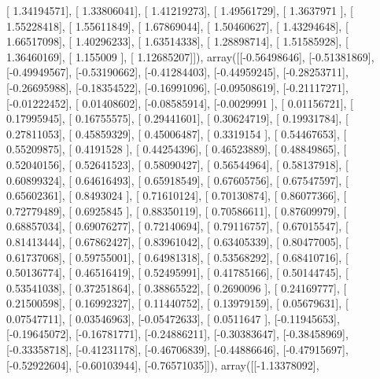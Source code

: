 \documentclass{article}
\begin{document}
       [ 1.34194571],
       [ 1.33806041],
       [ 1.41219273],
       [ 1.49561729],
       [ 1.3637971 ],
       [ 1.55228418],
       [ 1.55611849],
       [ 1.67869044],
       [ 1.50460627],
       [ 1.43294648],
       [ 1.66517098],
       [ 1.40296233],
       [ 1.63514338],
       [ 1.28898714],
       [ 1.51585928],
       [ 1.36460169],
       [ 1.155009  ],
       [ 1.12685207]]), array([[-0.56498646],
       [-0.51381869],
       [-0.49949567],
       [-0.53190662],
       [-0.41284403],
       [-0.44959245],
       [-0.28253711],
       [-0.26695988],
       [-0.18354522],
       [-0.16991096],
       [-0.09508619],
       [-0.21117271],
       [-0.01222452],
       [ 0.01408602],
       [-0.08585914],
       [-0.0029991 ],
       [ 0.01156721],
       [ 0.17995945],
       [ 0.16755575],
       [ 0.29441601],
       [ 0.30624719],
       [ 0.19931784],
       [ 0.27811053],
       [ 0.45859329],
       [ 0.45006487],
       [ 0.3319154 ],
       [ 0.54467653],
       [ 0.55209875],
       [ 0.4191528 ],
       [ 0.44254396],
       [ 0.46523889],
       [ 0.48849865],
       [ 0.52040156],
       [ 0.52641523],
       [ 0.58090427],
       [ 0.56544964],
       [ 0.58137918],
       [ 0.60899324],
       [ 0.64616493],
       [ 0.65918549],
       [ 0.67605756],
       [ 0.67547597],
       [ 0.65602361],
       [ 0.8493024 ],
       [ 0.71610124],
       [ 0.70130874],
       [ 0.86077366],
       [ 0.72779489],
       [ 0.6925845 ],
       [ 0.88350119],
       [ 0.70586611],
       [ 0.87609979],
       [ 0.68857034],
       [ 0.69076277],
       [ 0.72140694],
       [ 0.79116757],
       [ 0.67015547],
       [ 0.81413444],
       [ 0.67862427],
       [ 0.83961042],
       [ 0.63405339],
       [ 0.80477005],
       [ 0.61737068],
       [ 0.59755001],
       [ 0.64981318],
       [ 0.53568292],
       [ 0.68410716],
       [ 0.50136774],
       [ 0.46516419],
       [ 0.52495991],
       [ 0.41785166],
       [ 0.50144745],
       [ 0.53541038],
       [ 0.37251864],
       [ 0.38865522],
       [ 0.2690096 ],
       [ 0.24169777],
       [ 0.21500598],
       [ 0.16992327],
       [ 0.11440752],
       [ 0.13979159],
       [ 0.05679631],
       [ 0.07547711],
       [ 0.03546963],
       [-0.05472633],
       [ 0.0511647 ],
       [-0.11945653],
       [-0.19645072],
       [-0.16781771],
       [-0.24886211],
       [-0.30383647],
       [-0.38458969],
       [-0.33358718],
       [-0.41231178],
       [-0.46706839],
       [-0.44886646],
       [-0.47915697],
       [-0.52922604],
       [-0.60103944],
       [-0.76571035]]), array([[-1.13378092],
\end{document}
